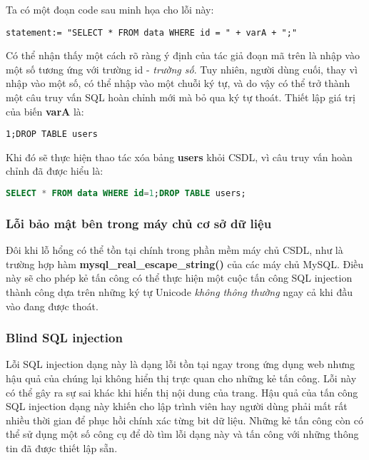 \documentclass[../main-report.tex]{subfiles}
\begin{document}
\begin{example}
Ta có một đoạn code sau minh họa cho lỗi này:

\begin{lstlisting}
statement:= "SELECT * FROM data WHERE id = " + varA + ";"
\end{lstlisting}
\end{example}

Có thể nhận thấy một cách rõ ràng ý định của tác giả đoạn mã trên là nhập vào một số tương ứng với trường id - \emph{trường số}. Tuy nhiên, người dùng cuối, thay vì nhập vào một số, có thể nhập vào một chuỗi ký tự, và do vậy có thể trở thành một câu truy vấn SQL hoàn chỉnh mới mà bỏ qua ký tự thoát. Thiết lập giá trị của biến \textbf{varA} là:

\begin{lstlisting}
1;DROP TABLE users
\end{lstlisting}

Khi đó sẽ thực hiện thao tác xóa bảng \textbf{users} khỏi CSDL, vì câu truy vấn hoàn chỉnh đã được hiểu là:

\begin{lstlisting}[language=SQL]
SELECT * FROM data WHERE id=1;DROP TABLE users;
\end{lstlisting}

\subsubsection*{Lỗi bảo mật bên trong máy chủ cơ sở dữ liệu}
Đôi khi lỗ hổng có thể tồn tại chính trong phần mềm máy chủ CSDL, như là trường hợp hàm \textbf{mysql\_real\_escape\_string()} của các máy chủ MySQL. Điều này sẽ cho phép kẻ tấn công có thể thực hiện một cuộc tấn công SQL injection thành công dựa trên những ký tự Unicode \emph{không thông thường} ngay cả khi đầu vào đang được thoát.

\subsubsection*{Blind SQL injection}
Lỗi SQL injection dạng này là dạng lỗi tồn tại ngay trong ứng dụng web nhưng hậu quả của chúng lại không hiển thị trực quan cho những kẻ tấn công. Lỗi này có thể gây ra sự sai khác khi hiển thị nội dung của trang. Hậu quả của tấn công SQL injection dạng này khiến cho lập trình viên hay người dùng phải mất rất nhiều thời gian để phục hồi chính xác từng bit dữ liệu. Những kẻ tấn công còn có thể sử dụng một số công cụ để dò tìm lỗi dạng này và tấn công với những thông tin đã được thiết lập sẵn.
\end{document}
